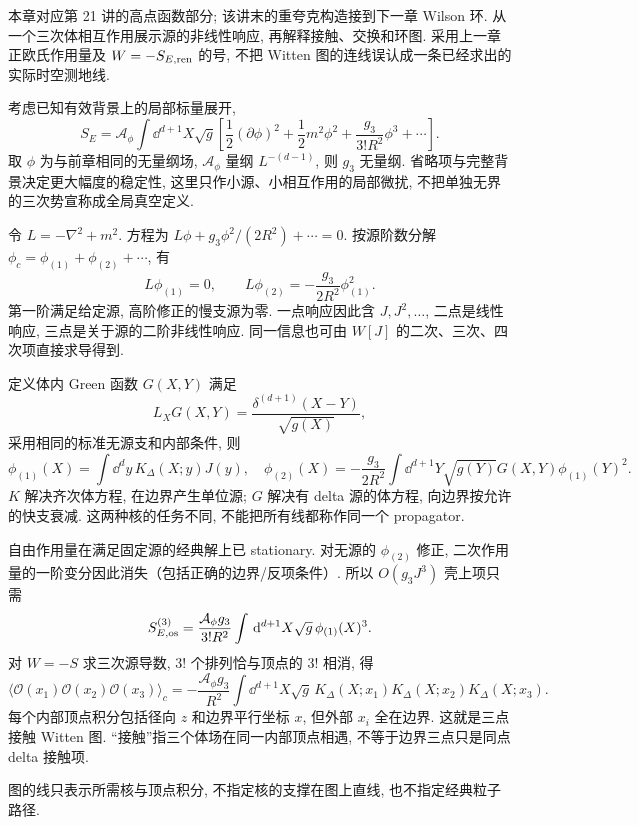 本章对应第 21 讲的高点函数部分; 该讲末的重夸克构造接到下一章 Wilson 环. 从一个三次体相互作用展示源的非线性响应, 再解释接触、交换和环图. 采用上一章正欧氏作用量及 $W=-S_{E,\rm ren}$ 的号, 不把 Witten 图的连线误认成一条已经求出的实际时空测地线.

考虑已知有效背景上的局部标量展开,
\[
S_E=\mathcal A_\phi\int\dd^{d+1}X\sqrt g
\left[\frac12(\partial\phi)^2+\frac12m^2\phi^2+
\frac{g_3}{3!R^2}\phi^3+\cdots\right].
\]
取 $\phi$ 为与前章相同的无量纲场, $\mathcal A_\phi$ 量纲 $L^{-(d-1)}$, 则 $g_3$ 无量纲. 省略项与完整背景决定更大幅度的稳定性, 这里只作小源、小相互作用的局部微扰, 不把单独无界的三次势宣称成全局真空定义.

令 $L=-\nabla^2+m^2$. 方程为 $L\phi+g_3\phi^2/(2R^2)+\cdots=0$. 按源阶数分解 $\phi_c=\phi_{(1)}+\phi_{(2)}+\cdots$, 有
\[
L\phi_{(1)}=0,\qquad
L\phi_{(2)}=-\frac{g_3}{2R^2}\phi_{(1)}^2.
\]
第一阶满足给定源, 高阶修正的慢支源为零. 一点响应因此含 $J,J^2,\ldots$, 二点是线性响应, 三点是关于源的二阶非线性响应. 同一信息也可由 $W[J]$ 的二次、三次、四次项直接求导得到.

定义体内 Green 函数 $G(X,Y)$ 满足
\[
L_XG(X,Y)=\frac{\delta^{(d+1)}(X-Y)}{\sqrt{g(X)}},
\]
采用相同的标准无源支和内部条件, 则
\[
\phi_{(1)}(X)=\int\dd^dy\,K_\Delta(X;y)J(y),
\quad
\phi_{(2)}(X)=-\frac{g_3}{2R^2}
\int\dd^{d+1}Y\sqrt{g(Y)}G(X,Y)\phi_{(1)}(Y)^2.
\]
$K$ 解决齐次体方程, 在边界产生单位源; $G$ 解决有 delta 源的体方程, 向边界按允许的快支衰减. 这两种核的任务不同, 不能把所有线都称作同一个 propagator.

自由作用量在满足固定源的经典解上已 stationary. 对无源的 $\phi_{(2)}$ 修正, 二次作用量的一阶变分因此消失（包括正确的边界/反项条件）. 所以 $O(g_3J^3)$ 壳上项只需
\[
S^{(3)}_{E,\rm os}=\frac{\mathcal A_\phi g_3}{3!R^2}
\int\,\mathrm d^{d+1}X\sqrt g\,\phi_{(1)}(X)^3.
\]
对 $W=-S$ 求三次源导数, $3!$ 个排列恰与顶点的 $3!$ 相消, 得
\[
\langle\mathcal O(x_1)\mathcal O(x_2)\mathcal O(x_3)\rangle_c
=-\frac{\mathcal A_\phi g_3}{R^2}
\int\dd^{d+1}X\sqrt g\,
K_\Delta(X;x_1)K_\Delta(X;x_2)K_\Delta(X;x_3).
\]
每个内部顶点积分包括径向 $z$ 和边界平行坐标 $x$, 但外部 $x_i$ 全在边界. 这就是三点接触 Witten 图. “接触”指三个体场在同一内部顶点相遇, 不等于边界三点只是同点 delta 接触项.

\begin{center}
\end{center}
图的线只表示所需核与顶点积分, 不指定核的支撑在图上直线, 也不指定经典粒子路径.

